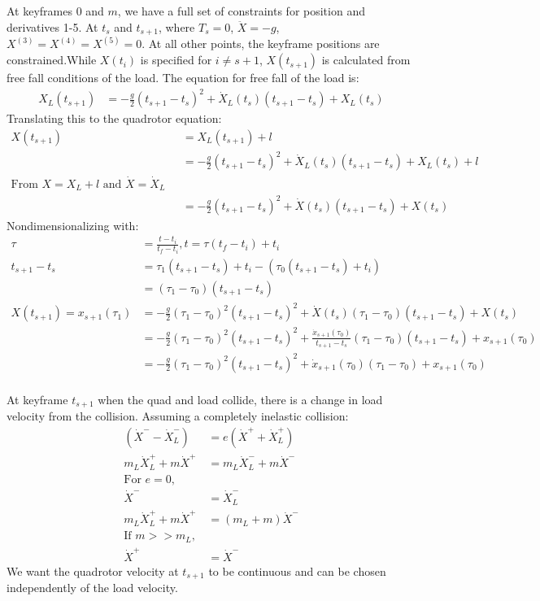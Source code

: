 \documentclass[11pt]{article}
\begin{document}
\mbox{} \newline
At keyframes $0$ and $m$, we have a full set of constraints for position and derivatives 1-5. At $t_s$ and $t_{s+1}$, where $T_{s} = 0$, $\ddot{X} = -g$, $X^{(3)} = X^{(4)} = X^{(5)} = 0$. At all other points, the keyframe positions are constrained.While $X(t_i)$ is specified for $i \ne s+1$, $X(t_{s+1})$ is calculated from free fall conditions of the load. The equation for free fall of the load is:
\begin{align*}
X_L(t_{s+1}) &= -\frac{g}{2}(t_{s+1}-t_s)^2+\dot{X}_L(t_s)(t_{s+1}-t_s) + X_L(t_s) 
\end{align*}
Translating this to the quadrotor equation: 
\begin{align*}
X(t_{s+1}) &= X_L(t_{s+1}) + l \\
&= -\frac{g}{2}(t_{s+1}-t_s)^2+\dot{X}_L(t_s)(t_{s+1}-t_s) + X_L(t_s) + l \\
\text{From $X = X_L + l$ and $\dot{X} = \dot{X}_L$ }& \\
&= -\frac{g}{2}(t_{s+1}-t_s)^2+\dot{X}(t_s)(t_{s+1}-t_s) + X(t_s)
\end{align*}
Nondimensionalizing with:
\begin{align*}
\tau &= \frac{t-t_i}{t_f-t_i}, t = \tau(t_f-t_i)+t_i \\
t_{s+1}-t_s &= \tau_1(t_{s+1}-t_s)+t_i - ( \tau_0(t_{s+1}-t_s)+t_i ) \\
&= (\tau_1 - \tau_0)(t_{s+1}-t_s) \\
X(t_{s+1}) = x_{s+1}(\tau_1)&= -\frac{g}{2}(\tau_1 - \tau_0)^2 (t_{s+1}-t_s)^2+\dot{X}(t_s)(\tau_1 - \tau_0)(t_{s+1}-t_s) + X(t_s) \\
&= -\frac{g}{2}(\tau_1 - \tau_0)^2 (t_{s+1}-t_s)^2+\frac{ \dot{x}_{s+1}(\tau_0) } { t_{s+1}-t_s } (\tau_1 - \tau_0)(t_{s+1}-t_s) + x_{s+1}(\tau_0) \\
&=  -\frac{g}{2}(\tau_1 - \tau_0)^2 (t_{s+1}-t_s)^2+ \dot{x}_{s+1}(\tau_0)  (\tau_1 - \tau_0)+ x_{s+1}(\tau_0) \\
\end{align*}

At keyframe $t_{s+1}$ when the quad and load collide, there is a change in load velocity from the collision. Assuming a completely inelastic collision: 
\begin{align*}
(\dot{X}^- - \dot{X}_L^-) &= e ( \dot{X}^+ + \dot{X}_L^+)\\
m_L \dot{X}_L^+ + m \dot{X}^+ &= m_L \dot{X}_L^- + m \dot{X}^- \\
\text{For $e = 0$, } & \\
\dot{X}^- &= \dot{X}_L^- \\
m_L \dot{X}_L^+ + m \dot{X}^+ &= (m_L+m) \dot{X}^- \\
\text{If $m >> m_L$, } & \\
 \dot{X}^+ &= \dot{X}^-
\end{align*}
We want the quadrotor velocity at $t_{s+1}$ to be continuous and can be chosen independently of the load velocity. 
\end{document}
